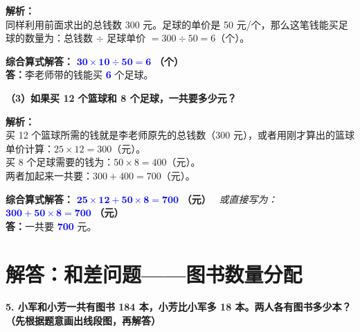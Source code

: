 \documentclass[12pt, a4paper]{ctexrep}
\begin{document}
\vspace{0.2cm}

{\small\color{gray}
\textbf{解析：}\\
同样利用前面求出的总钱数 300 元。足球的单价是 50 元/个，那么这笔钱能买足球的数量为：总钱数 $\div$ 足球单价 $= 300 \div 50 = 6$（个）。
}

\vspace{0.2cm}
\noindent\textbf{综合算式解答：} \textbf{\textcolor{blue}{$\boldsymbol{30 \times 10 \div 50 = 6}$}} \textbf{（个）} \\
\noindent\textbf{答：}李老师带的钱能买 \textbf{\textcolor{blue}{6}} 个足球。

\vspace{0.6cm}

\noindent\textbf{（3）如果买 12 个篮球和 8 个足球，一共要多少元？}

\vspace{0.2cm}

{\small\color{gray}
\textbf{解析：}\\
买 12 个篮球所需的钱就是李老师原先的总钱数（$300$ 元），或者用刚才算出的篮球单价计算：$25 \times 12 = 300$（元）。\\
买 8 个足球需要的钱为：$50 \times 8 = 400$（元）。\\
两者加起来一共要：$300 + 400 = 700$（元）。
}

\vspace{0.2cm}
\noindent\textbf{综合算式解答：} \textbf{\textcolor{blue}{$\boldsymbol{25 \times 12 + 50 \times 8 = 700}$}} \textbf{（元）} \ \textit{或直接写为：} \textbf{\textcolor{blue}{$\boldsymbol{300 + 50 \times 8 = 700}$}} \textbf{（元）}\\
\noindent\textbf{答：}一共要 \textbf{\textcolor{blue}{700}} 元。


\newpage

\section{解答：和差问题——图书数量分配}

\vspace{0.4cm}

\noindent\textbf{5. 小军和小芳一共有图书 184 本，小芳比小军多 18 本。两人各有图书多少本？（先根据题意画出线段图，再解答）}

\vspace{0.8cm}
\end{document}
